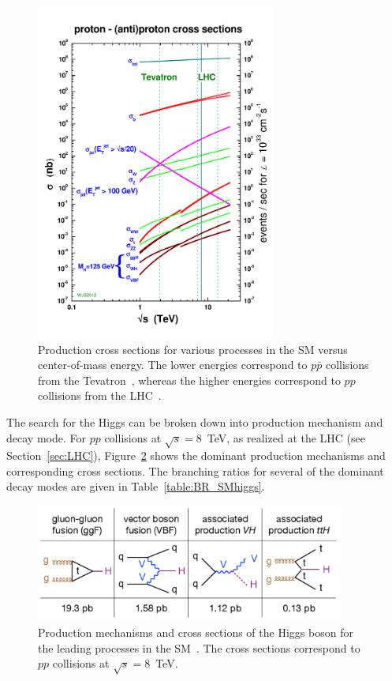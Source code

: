 \begin{figure}[ht]
 \begin{center}
    \includegraphics[width=0.70\textwidth]{figures/intro/crosssections2012_v5.pdf}
      \end{center}
\caption{Production cross sections for various processes in the SM versus center-of-mass energy.
The lower energies correspond to $p\bar{p}$ collisions from the Tevatron~\cite{Group:1984bk}, whereas
the higher energies correspond to $pp$ collisions from the LHC~\cite{cern-jinst-lhc}.}
\label{fig:crosssections}
\end{figure}

The search for the Higgs can be broken down into production mechanism and decay mode. For $pp$
collisions at $\sqrt{s} = 8$~TeV, as realized at the LHC (see Section~\ref{sec:LHC}),
Figure~\ref{fig:higgsprod} shows the
dominant production mechanisms and corresponding cross sections. The branching ratios for several
of the dominant decay modes are given in Table~\ref{table:BR_SMhiggs}.

\begin{figure}[ht]
 \begin{center}
    \includegraphics[width=0.90\textwidth]{figures/intro/higgsproductions.pdf}
      \end{center}
\caption{Production mechanisms and cross sections of the Higgs boson
for the leading processes in the SM~\cite{Tuna:thesis}. The cross sections correspond to
$pp$ collisions at $\sqrt{s} = 8$~TeV.}
\label{fig:higgsprod}
\end{figure}

